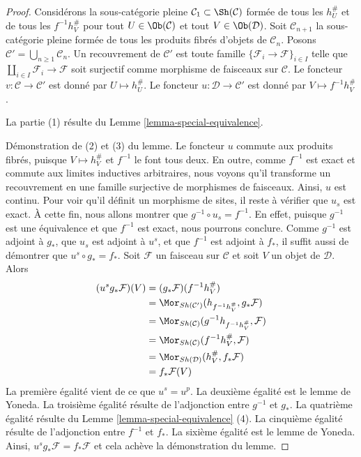 \begin{proof}
Considérons la sous-catégorie pleine
$\mathcal{C}_1 \subset \Sh(\mathcal{C})$ formée de tous les
$h_U^\#$ et de tous les $f^{-1}h_V^\#$ pour tout
$U \in \Ob(\mathcal{C})$ et tout $V \in \Ob(\mathcal{D})$.
Soit $\mathcal{C}_{n + 1}$ la sous-catégorie pleine formée de tous les
produits fibrés d’objets de $\mathcal{C}_n$. Posons
$\mathcal{C}' = \bigcup_{n \geq 1} \mathcal{C}_n$.
Un recouvrement de $\mathcal{C}'$ est toute famille
$\{\mathcal{F}_i \to \mathcal{F}\}_{i \in I}$ telle que
$\coprod_{i \in I} \mathcal{F}_i \to \mathcal{F}$ soit surjectif
comme morphisme de faisceaux sur $\mathcal{C}$.
Le foncteur $v : \mathcal{C} \to \mathcal{C'}$ est donné par
$U \mapsto h_U^\#$.
Le foncteur $u : \mathcal{D} \to \mathcal{C'}$ est donné par
$V \mapsto f^{-1}h_V^\#$.

\medskip\noindent
La partie (1) résulte du Lemme \ref{lemma-special-equivalence}.

\medskip\noindent
Démonstration de (2) et (3) du lemme. Le foncteur $u$ commute aux produits
fibrés, puisque $V \mapsto h_V^\#$ et $f^{-1}$ le font tous deux. En outre,
comme $f^{-1}$ est exact et commute aux limites inductives arbitraires, nous voyons
qu’il transforme un recouvrement en une famille surjective de morphismes de
faisceaux. Ainsi, $u$ est continu. Pour voir qu’il définit un morphisme de
sites, il reste à vérifier que $u_s$ est exact. À cette fin,
nous allons montrer que $g^{-1} \circ u_s = f^{-1}$. En effet, puisque $g^{-1}$
est une équivalence et que $f^{-1}$ est exact, nous pourrons conclure.
Comme $g^{-1}$ est adjoint à $g_*$, que $u_s$ est adjoint à
$u^s$, et que $f^{-1}$ est adjoint à $f_*$, il suffit aussi de démontrer que
$u^s \circ g_* = f_*$. Soit $\mathcal{F}$ un faisceau sur $\mathcal{C}$
et soit $V$ un objet de $\mathcal{D}$. Alors
\begin{align*}
(u^s g_{\ast}\mathcal{F})(V)
& =
(g_{\ast}\mathcal{F})(f^{-1}h_V^\#) \\
& =
\Mor_{Sh(\mathcal{C}')}(h_{f^{-1}h_V^\#},g_{\ast}\mathcal{F}) \\
& =
\Mor_{Sh(\mathcal{C})}(g^{-1}h_{f^{-1}h_V^\#},\mathcal{F}) \\
& =
\Mor_{Sh(\mathcal{C})}(f^{-1}h_V^\#,\mathcal{F}) \\
& =
\Mor_{Sh(\mathcal{D})}(h_V^\#,f_{\ast}\mathcal{F}) \\
& =
f_{\ast}\mathcal{F}(V)
\end{align*}
La première égalité vient de ce que $u^s = u^p$.
La deuxième égalité est le lemme de Yoneda.
La troisième égalité résulte de l’adjonction entre $g^{-1}$ et $g_*$.
La quatrième égalité résulte du Lemme \ref{lemma-special-equivalence} (4).
La cinquième égalité résulte de l’adjonction entre $f^{-1}$ et $f_*$.
La sixième égalité est le lemme de Yoneda.
Ainsi, $u^s g_*\mathcal{F} = f_*\mathcal{F}$ et
cela achève la démonstration du lemme.
\end{proof}

